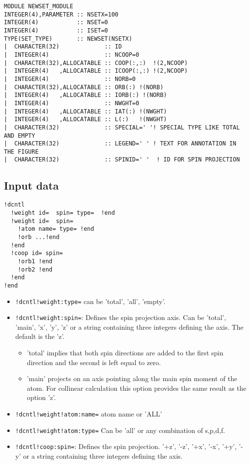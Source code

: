\documentclass[11pt,a4paper]{report}
\begin{document}
\begin{verbatim}
MODULE NEWSET_MODULE
INTEGER(4),PARAMETER :: NSETX=100
INTEGER(4)           :: NSET=0
INTEGER(4)           :: ISET=0
TYPE(SET_TYPE)       :: NEWSET(NSETX) 
|  CHARACTER(32)             :: ID
|  INTEGER(4)                :: NCOOP=0
|  CHARACTER(32),ALLOCATABLE :: COOP(:,:)  !(2,NCOOP)
|  INTEGER(4)   ,ALLOCATABLE :: ICOOP(:,:) !(2,NCOOP)
|  INTEGER(4)                :: NORB=0
|  CHARACTER(32),ALLOCATABLE :: ORB(:) !(NORB)
|  INTEGER(4)   ,ALLOCATABLE :: IORB(:) !(NORB)
|  INTEGER(4)                :: NWGHT=0
|  INTEGER(4)   ,ALLOCATABLE :: IAT(:) !(NWGHT)
|  INTEGER(4)   ,ALLOCATABLE :: L(:)   !(NWGHT)
|  CHARACTER(32)             :: SPECIAL=' '! SPECIAL TYPE LIKE TOTAL AND EMPTY
|  CHARACTER(32)             :: LEGEND=' ' ! TEXT FOR ANNOTATION IN THE FIGURE
|  CHARACTER(32)             :: SPINID=' '  ! ID FOR SPIN PROJECTION
\end{verbatim}

\subsection{Input data}

\begin{verbatim}
!dcntl
  !weight id=  spin= type=  !end
  !weight id=  spin= 
    !atom name= type= !end
    !orb ...!end
  !end
  !coop id= spin=
    !orb1 !end
    !orb2 !end
  !end
!end
\end{verbatim}

\begin{itemize}
  \item \verb|!dcntl!weight:type=| can be 'total', 'all', 'empty'.
%
  \item \verb|!dcntl!weight:spin=|: Defines the spin projection axis.
    Can be 'total', 'main', 'x', 'y', 'z' or a string containing three
    integers defining the axis.  The default is the 'z'.
  \begin{itemize}
    \item 'total' implies that both spin directions are added to the
      first spin direction and the second is left equal to zero.
    \item 'main' projects on an axis pointing along the main spin
      moment of the atom. For collinear calculation this option
      provides the same result as the option  'z'.
  \end{itemize}
%
  \item \verb|!dcntl!weight!atom:name=| atom name or 'ALL'
%
  \item \verb|!dcntl!weight!atom:type=| Can be 'all' or any combination
    of s,p,d,f.
   
  \item \verb|!dcntl!coop:spin=|: Defines the spin projection.
     '+z', '-z', '+x', '-x', '+y', '-y' or a string containing three
    integers defining the axis.  
\end{itemize}
\end{document}

